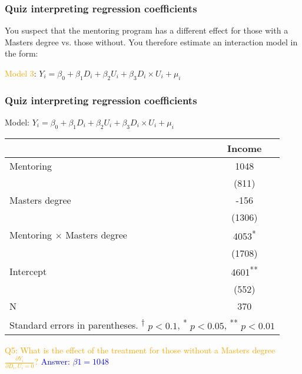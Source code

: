 \documentclass[12pt,english,dvipsnames,aspectratio=169,handout]{beamer}\usepackage[]{graphicx}\usepackage[]{xcolor}
\begin{document}
\begin{frame}
	\frametitle{Quiz interpreting regression coefficients}
\footnotesize

You suspect that the mentoring program has a different effect for those with a Masters degree vs. those without. You therefore estimate an interaction model in the form:

\normalsize\vspace{3mm}
\textcolor{orange}{Model 3}: ${Y}_i = \beta_0 + \beta_1 D_i + \beta_2 U_i + \beta_3 D_i\times U_i + \mu_i$
\footnotesize

\vspace{25mm}

\end{frame}



\begin{frame}
	\frametitle{Quiz interpreting regression coefficients}
\centering
\tiny
Model: ${Y}_i = \beta_0 + \beta_1 D_i + \beta_2 U_i + \beta_3 D_i\times U_i + \mu_i$

\scriptsize
\begin{tabular}{l*{1}{c}}
\toprule
          &\multicolumn{1}{c}{Income}\\
\midrule
Mentoring     &     1048        \\
          &    (811)        \\
Masters degree    &     -156        \\
          &   (1306)        \\
Mentoring $\times$ Masters degree &     4053\textsuperscript{*} \\
          &   (1708)        \\
Intercept    &     4601\textsuperscript{**}\\
          &    (552)        \\
\midrule
N         &      370        \\
\bottomrule
\multicolumn{2}{l}{Standard errors in parentheses. \textsuperscript{†} \(p<0.1\), \textsuperscript{*} \(p<0.05\), \textsuperscript{**} \(p<0.01\)}\\
\end{tabular}
\footnotesize\flushleft

\textcolor{orange}{Q5: What is the effect of the treatment for those without a Masters degree $\frac{\partial Y_i}{\partial D_i, U_i=0}$?} \textcolor{blue}{Answer: $\beta1  = 1048$}

\end{frame}
\end{document}
